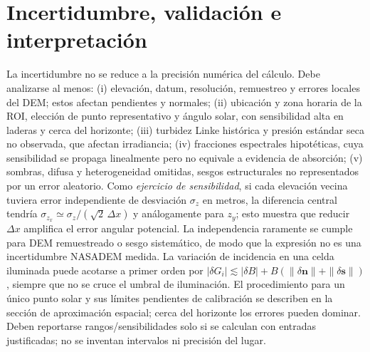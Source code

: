 \documentclass[11pt,a4paper]{article}
\begin{document}
\section{Incertidumbre, validación e interpretación}
La incertidumbre no se reduce a la precisión numérica del cálculo. Debe analizarse al menos: (i) elevación, datum, resolución, remuestreo y errores locales del DEM; estos afectan pendientes y normales; (ii) ubicación y zona horaria de la ROI, elección de punto representativo y ángulo solar, con sensibilidad alta en laderas y cerca del horizonte; (iii) turbidez Linke histórica y presión estándar seca no observada, que afectan irradiancia; (iv) fracciones espectrales hipotéticas, cuya sensibilidad se propaga linealmente pero no equivale a evidencia de absorción; (v) sombras, difusa y heterogeneidad omitidas, sesgos estructurales no representados por un error aleatorio. Como \emph{ejercicio de sensibilidad}, si cada elevación vecina tuviera error independiente de desviación $\sigma_z$ en metros, la diferencia central tendría $\sigma_{z_x}\simeq\sigma_z/(\sqrt{2}\,\Delta x)$ y análogamente para $z_y$; esto muestra que reducir $\Delta x$ amplifica el error angular potencial. La independencia raramente se cumple para DEM remuestreado o sesgo sistemático, de modo que la expresión no es una incertidumbre NASADEM medida. La variación de incidencia en una celda iluminada puede acotarse a primer orden por $|\delta G_i|\lesssim|\delta B|+B(\|\delta\mathbf n\|+\|\delta\mathbf s\|)$, siempre que no se cruce el umbral de iluminación. El procedimiento para un único punto solar y sus límites pendientes de calibración se describen en la sección de aproximación espacial; cerca del horizonte los errores pueden dominar. Deben reportarse rangos/sensibilidades solo si se calculan con entradas justificadas; no se inventan intervalos ni precisión del lugar.
\end{document}
